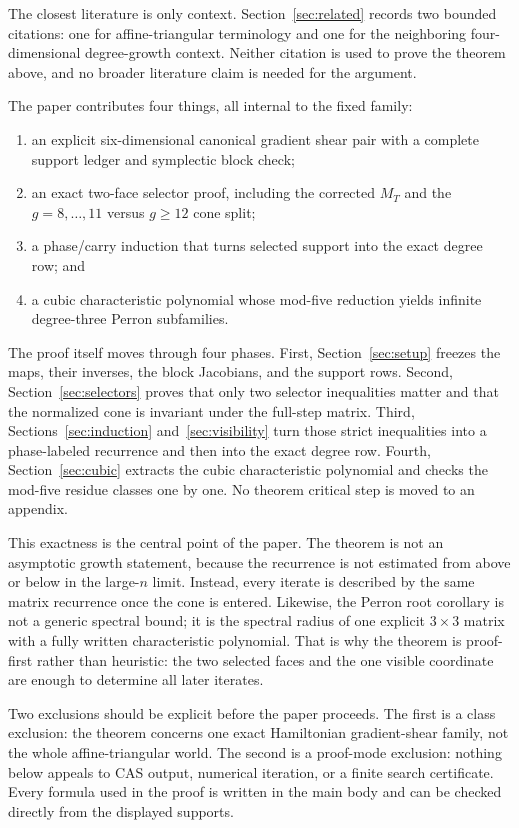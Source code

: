 \documentclass[11pt]{article}
\theoremstyle{remark}
\numberwithin{equation}{section}
\begin{document}
The closest literature is only context.  Section~\ref{sec:related} records two
bounded citations: one for affine-triangular terminology and one for the
neighboring four-dimensional degree-growth context.  Neither citation is used
to prove the theorem above, and no broader literature claim is needed for the
argument.

The paper contributes four things, all internal to the fixed family:
\begin{enumerate}
\item an explicit six-dimensional canonical gradient shear pair with a complete
  support ledger and symplectic block check;
\item an exact two-face selector proof, including the corrected \(M_T\) and the
  \(g=8,\dots,11\) versus \(g\geq 12\) cone split;
\item a phase/carry induction that turns selected support into the exact degree
  row; and
\item a cubic characteristic polynomial whose mod-five reduction yields
  infinite degree-three Perron subfamilies.
\end{enumerate}

The proof itself moves through four phases.  First, Section~\ref{sec:setup}
freezes the maps, their inverses, the block Jacobians, and the support rows.
Second, Section~\ref{sec:selectors} proves that only two selector inequalities
matter and that the normalized cone is invariant under the full-step matrix.
Third, Sections~\ref{sec:induction} and~\ref{sec:visibility} turn those strict
inequalities into a phase-labeled recurrence and then into the exact degree
row.  Fourth, Section~\ref{sec:cubic} extracts the cubic characteristic
polynomial and checks the mod-five residue classes one by one.  No theorem
critical step is moved to an appendix.

This exactness is the central point of the paper.  The theorem is not an
asymptotic growth statement, because the recurrence is not estimated from above
or below in the large-\(n\) limit.  Instead, every iterate is described by the
same matrix recurrence once the cone is entered.  Likewise, the Perron root
corollary is not a generic spectral bound; it is the spectral radius of one
explicit \(3\times 3\) matrix with a fully written characteristic polynomial.
That is why the theorem is proof-first rather than heuristic: the two selected
faces and the one visible coordinate are enough to determine all later iterates.

Two exclusions should be explicit before the paper proceeds.  The first is a
class exclusion: the theorem concerns one exact Hamiltonian gradient-shear
family, not the whole affine-triangular world.  The second is a proof-mode
exclusion: nothing below appeals to CAS output, numerical iteration, or a
finite search certificate.  Every formula used in the proof is written in the
main body and can be checked directly from the displayed supports.
\end{document}
